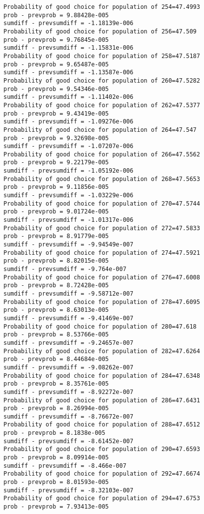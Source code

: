 \documentclass[11pt,onecolumn]{article}
\begin{document}
\begin{verbatim}
Probability of good choice for population of 254=47.4993
prob - prevprob = 9.88428e-005
sumdiff - prevsumdiff = -1.18139e-006
Probability of good choice for population of 256=47.509
prob - prevprob = 9.76845e-005
sumdiff - prevsumdiff = -1.15831e-006
Probability of good choice for population of 258=47.5187
prob - prevprob = 9.65487e-005
sumdiff - prevsumdiff = -1.13587e-006
Probability of good choice for population of 260=47.5282
prob - prevprob = 9.54346e-005
sumdiff - prevsumdiff = -1.11402e-006
Probability of good choice for population of 262=47.5377
prob - prevprob = 9.43419e-005
sumdiff - prevsumdiff = -1.09276e-006
Probability of good choice for population of 264=47.547
prob - prevprob = 9.32698e-005
sumdiff - prevsumdiff = -1.07207e-006
Probability of good choice for population of 266=47.5562
prob - prevprob = 9.22179e-005
sumdiff - prevsumdiff = -1.05192e-006
Probability of good choice for population of 268=47.5653
prob - prevprob = 9.11856e-005
sumdiff - prevsumdiff = -1.03229e-006
Probability of good choice for population of 270=47.5744
prob - prevprob = 9.01724e-005
sumdiff - prevsumdiff = -1.01317e-006
Probability of good choice for population of 272=47.5833
prob - prevprob = 8.91779e-005
sumdiff - prevsumdiff = -9.94549e-007
Probability of good choice for population of 274=47.5921
prob - prevprob = 8.82015e-005
sumdiff - prevsumdiff = -9.764e-007
Probability of good choice for population of 276=47.6008
prob - prevprob = 8.72428e-005
sumdiff - prevsumdiff = -9.58712e-007
Probability of good choice for population of 278=47.6095
prob - prevprob = 8.63013e-005
sumdiff - prevsumdiff = -9.41469e-007
Probability of good choice for population of 280=47.618
prob - prevprob = 8.53766e-005
sumdiff - prevsumdiff = -9.24657e-007
Probability of good choice for population of 282=47.6264
prob - prevprob = 8.44684e-005
sumdiff - prevsumdiff = -9.08262e-007
Probability of good choice for population of 284=47.6348
prob - prevprob = 8.35761e-005
sumdiff - prevsumdiff = -8.92272e-007
Probability of good choice for population of 286=47.6431
prob - prevprob = 8.26994e-005
sumdiff - prevsumdiff = -8.76672e-007
Probability of good choice for population of 288=47.6512
prob - prevprob = 8.1838e-005
sumdiff - prevsumdiff = -8.61452e-007
Probability of good choice for population of 290=47.6593
prob - prevprob = 8.09914e-005
sumdiff - prevsumdiff = -8.466e-007
Probability of good choice for population of 292=47.6674
prob - prevprob = 8.01593e-005
sumdiff - prevsumdiff = -8.32103e-007
Probability of good choice for population of 294=47.6753
prob - prevprob = 7.93413e-005

\end{verbatim}
\end{document}
